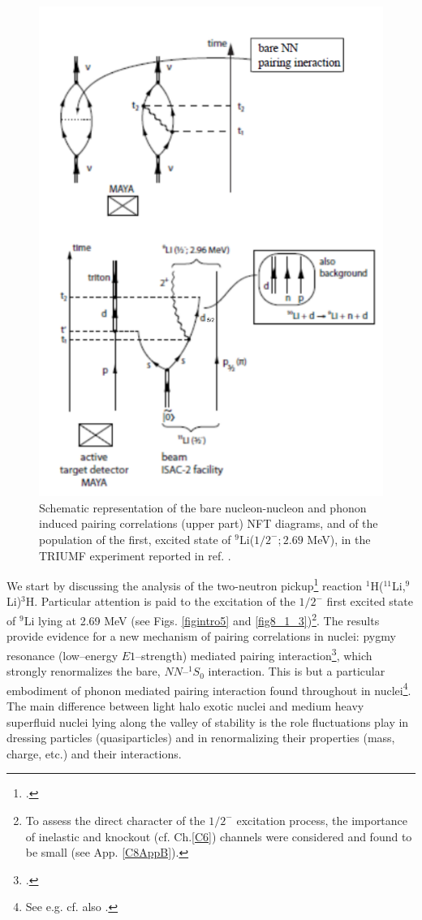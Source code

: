  \begin{figure}
 \centerline{\includegraphics*[width=15cm,angle=0]{C8/figsC8/fig8_1_1}}
 	\caption{Schematic representation of the bare nucleon-nucleon and phonon induced pairing correlations (upper part) NFT diagrams, and of the population of the first, excited state of $^{9}$Li($1/2^{-}; 2.69$ MeV), in the TRIUMF experiment  reported in ref. \cite{Tanihata:08}.}\label{fig8_1_1}
 \end{figure}
 We start by discussing  the analysis of the two-neutron pickup\footnote{\cite{Tanihata:08}.} reaction $^1$H($^{11}$Li,$^9$Li)$^3$H. Particular  attention is paid to the  excitation of the $1/2^-$ first excited state of $^9$Li lying at 2.69 MeV (see Figs. \ref{figintro5} and  \ref{fig8_1_3})\footnote{To assess the direct character of the $1/2^-$ excitation process, the importance of inelastic  and knockout (cf. Ch.\ref{C6}) channels were considered and found to be small (see App. \ref{C8AppB}).}. The results  provide evidence for a new mechanism of pairing correlations in nuclei: pygmy resonance (low--energy $E1$--strength) mediated pairing interaction\footnote{\citet{Barranco:01,Potel:10}.}, which strongly renormalizes the bare, $NN$--$^1S_0$ interaction. This is but a particular embodiment of phonon mediated pairing interaction found throughout in nuclei\footnote{See e.g. \citet{Barranco:99,Gori:04} cf. also \citet{Brink:05}.}. The main difference between light halo exotic nuclei and medium heavy superfluid nuclei lying along the valley of stability is the role fluctuations play in dressing particles (quasiparticles) and in renormalizing their properties (mass, charge, etc.) and their interactions.
